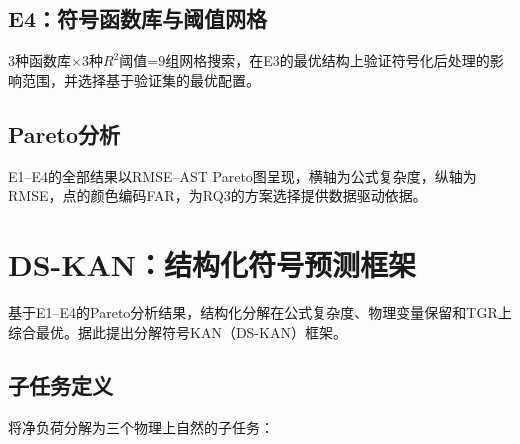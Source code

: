 \documentclass[12pt,a4paper,oneside]{ctexbook}
\begin{document}
\subsection{E4：符号函数库与阈值网格}

3种函数库$\times$3种$R^2$阈值=9组网格搜索，在E3的最优结构上验证符号化后处理的影响范围，并选择基于验证集的最优配置。

\subsection{Pareto分析}

E1--E4的全部结果以RMSE--AST Pareto图呈现，横轴为公式复杂度，纵轴为RMSE，点的颜色编码FAR，为RQ3的方案选择提供数据驱动依据。

\section{DS-KAN：结构化符号预测框架}
\label{sec:dskan}

基于E1--E4的Pareto分析结果，结构化分解在公式复杂度、物理变量保留和TGR上综合最优。据此提出分解符号KAN（DS-KAN）框架。

\subsection{子任务定义}

将净负荷分解为三个物理上自然的子任务：
\end{document}
